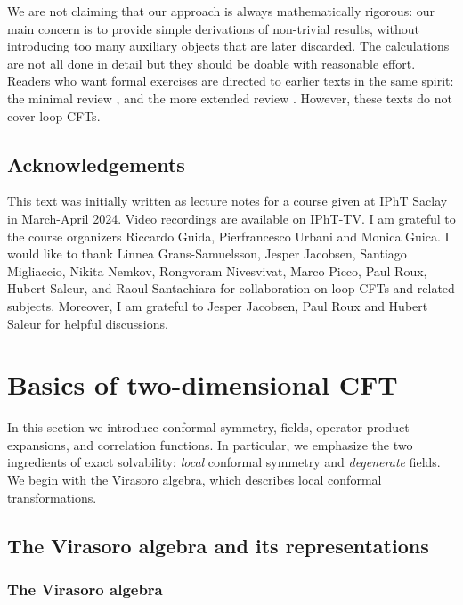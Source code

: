 \documentclass[12pt, a4paper]{article}
\theoremstyle{break}
\begin{document}
We are not claiming that our approach is always mathematically rigorous: our main concern is to provide simple derivations of non-trivial results, without introducing too many auxiliary objects that are later discarded. The calculations are not all done in detail but they should be doable with reasonable effort. Readers who want formal exercises are directed to earlier texts in the same spirit: the minimal review \cite{rib16}, and the more extended review \cite{rib14}. However, these texts do not cover loop CFTs.


\subsection*{Acknowledgements}

This text was initially written as lecture notes for a course given at IPhT Saclay in March-April 2024. Video recordings are available on \href{https://www.youtube.com/playlist?list=PLrLctLPAdPNtD7yFOcfdNx2J-A_CE1svr}{IPhT-TV}. I am grateful to the course organizers Riccardo Guida, Pierfrancesco Urbani and Monica Guica. I would like to thank Linnea Grans-Samuelsson, Jesper Jacobsen, Santiago Migliaccio, Nikita Nemkov, Rongvoram Nivesvivat, Marco Picco, Paul Roux, Hubert Saleur, and Raoul Santachiara for collaboration on loop CFTs and related subjects. Moreover, I am grateful to Jesper Jacobsen, Paul Roux and Hubert Saleur for helpful discussions. 



\section{Basics of two-dimensional CFT}\label{sec:bo}

In this section we introduce conformal symmetry, fields, operator product expansions, and correlation functions. In particular, we emphasize the two ingredients of exact solvability: \textit{local} conformal symmetry and \textit{degenerate} fields. We begin with the Virasoro algebra, which describes local conformal transformations. 

\subsection{The Virasoro algebra and its representations}\label{sec:vir}

\subsubsection{The Virasoro algebra}
\end{document}
